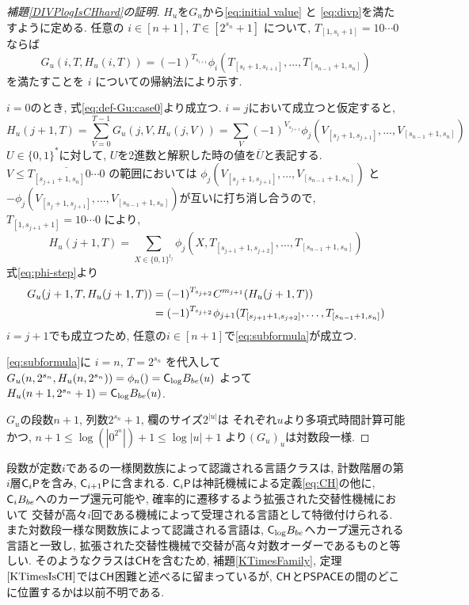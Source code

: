 \begin{proof}[\textup{補題\ref{DIVPlogIsCHhard}の証明}]
 $H_u$を$G_u$から\eqref{eq:initial value} と \eqref{eq:divp}を満たすように定める.
 任意の $i \in [n+1]$, $T \in [2^{s_n}+1]$ について,
 $T_{[1, s_i +1]} = 10 \cdots 0$ ならば
 \begin{equation} \label{eq:subformula}
  G_u(i,T,H_u(i,T)) = (-1)^{T_{s_{i+1}}} 
   \phi_i(T_{[s_i+1, s_{i+1}]}, \dots, T_{[s_{n-1}+1, s_n]})
 \end{equation}
 を満たすことを $i$ についての帰納法により示す.

 $i=0$のとき, 式\eqref{eq:def-Gu:case0}より成立つ.
 $i=j$において成立つと仮定すると, 
\begin{equation}
  H_u(j+1, T) 
  = \sum_{V = 0}^{T-1} G_u(j, V, H_u(j, V)) 
  = \sum_{V} (-1)^{V_{s_{j+1}}} \phi_j(V_{[s_j+1, s_{j+1}]}, 
   \dots, V_{[s_{n-1}+1, s_n]})
\end{equation}
 $U \in \{0,1\}^*$に対して, $U$を2進数と解釈した時の値を$\overline U$と表記する.
 $V \le \overline{T_{[s_{j+1}+1, s_n]} 0 \cdots 0}$ の範囲においては
 $\phi_j(V_{[s_j+1, s_{j+1}]}, \dots, V_{[s_{n-1}+1, s_n]})$ と
 $- \phi_j(V_{[s_j+1, s_{j+1}]}, \dots, V_{[s_{n-1}+1, s_n]})$が互いに打ち消し合うので, $T_{[1,s_{j+1} +1]} = 10 \cdots 0$ により,
 \begin{equation}
  H_u(j+1, T) = \sum_{X \in \{0,1\}^{l_j}}
  \phi_j(X, T_{[s_{j+1}+1, s_{j+2}]}, \dots, T_{[s_{n-1}+1, s_n]})
 \end{equation}
 式\eqref{eq:phi-step}より
 \begin{align}
  G_u(j+1,T,H_u(j+1,T)) 
  &= (-1)^{T_{s_{j+2}}} C^{m_{j+1}} (H_u(j+1, T))
\notag
\\
  &= (-1)^{T_{s_{j+2}}} \phi_{j+1}(T_{[s_{j+1}+1, s_{j+2}]}, \dots, T_{[s_{n-1}+1, s_n]})
 \end{align}
 $i=j+1$でも成立つため, 任意の$i \in [n+1]$で\eqref{eq:subformula}が成立つ.


 \eqref{eq:subformula}に $i=n$, $T=2^{s_n}$ を代入して 
 $G_u(n, 2^{s_n}, H_u(n,2^{s_n})) = \phi_n() = \mathsf{C}_{\log} B_{be}(u)$
 よって $H_u(n+1, 2^{s_n}+1) = \mathsf{C}_{\log} B_{be}(u)$.
 
 $G_u$の段数$n+1$, 列数$2^{s_n}+1$, 欄のサイズ$2^{|u|}$は
 それぞれ$u$より多項式時間計算可能かつ,
 $n+1 \le \log(|0^{2^n}|) + 1 \le \log|u| + 1$
 より$(G_u)_u$は対数段一様.
 \end{proof}



段数が定数$i$であるの一様関数族によって認識される言語クラスは,
計数階層の第$i$層$\mathsf{C}_i \mathsf{P}$を含み, $\mathsf{C}_{i+1} \mathsf{P}$に含まれる.
$\mathsf{C}_i \mathsf{P}$は神託機械による定義\eqref{eq:CH}の他に,
$\mathsf{C}_i B_{be}$へのカープ還元可能や,
確率的に遷移するよう拡張された交替性機械において
交替が高々$i$回である機械によって受理される言語として特徴付けられる.
また対数段一様な関数族によって認識される言語は,
$\mathsf{C}_{\log} B_{be}$へカープ還元される言語と一致し,
拡張された交替性機械で交替が高々対数オーダーであるものと等しい.
そのようなクラスは$\mathsf{CH}$を含むため, 補題\ref{KTimesFamily}, 
定理$\ref{KTimesIsCH}$では$\mathsf{CH}$困難と述べるに留まっているが,
$\mathsf{CH}$と$\mathsf{PSPACE}$の間のどこに位置するかは以前不明である.



